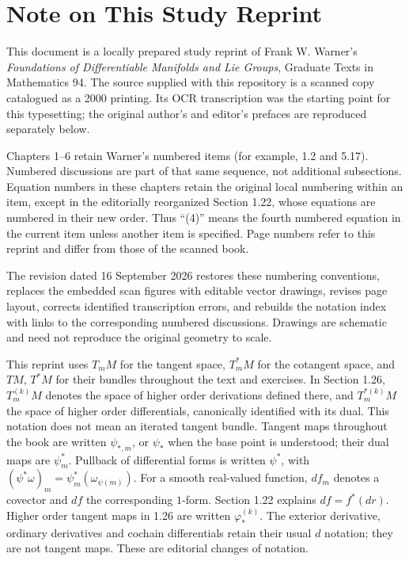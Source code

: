 \chapter*{Note on This Study Reprint}
This document is a locally prepared study reprint of Frank W. Warner's
\emph{Foundations of Differentiable Manifolds and Lie Groups}, Graduate Texts
in Mathematics 94. The source supplied with this repository is a scanned
copy catalogued as a 2000 printing. Its OCR transcription was the starting
point for this typesetting; the original author's and editor's prefaces
are reproduced separately below.

Chapters 1--6 retain Warner's numbered items (for example, 1.2 and 5.17).
Numbered discussions are part of that same sequence, not additional
subsections. Equation numbers in these chapters retain the original local
numbering within an item, except in the editorially reorganized Section 1.22,
whose equations are numbered in their new order. Thus ``(4)'' means the fourth numbered equation
in the current item unless another item is specified. Page numbers refer
to this reprint and differ from those of the scanned book.

The revision dated 16 September 2026 restores these numbering conventions,
replaces the embedded scan figures with editable vector drawings, revises
page layout, corrects identified transcription errors, and rebuilds the
notation index with links to the corresponding numbered discussions.
Drawings are schematic and need not reproduce the original geometry to scale.

This reprint uses $T_mM$ for the tangent space, $T_m^*M$ for the
cotangent space, and $TM$, $T^*M$ for their bundles throughout the text
and exercises. In Section 1.26, $T_m^{(k)}M$ denotes the space of
higher order derivations defined there, and $T_m^{*(k)}M$ the space of
higher order differentials, canonically identified with its dual.
This notation does not mean an iterated tangent bundle.
Tangent maps throughout the book are written $\psi_{*,m}$, or $\psi_*$
when the base point is understood; their dual maps are $\psi_m^*$.
Pullback of differential forms is written $\psi^*$, with
$(\psi^*\omega)_m=\psi_m^*(\omega_{\psi(m)})$.
For a smooth real-valued function, $df_m$ denotes a covector and $df$
the corresponding $1$-form. Section 1.22 explains $df=f^*(dr)$.
Higher order tangent maps in 1.26 are written $\varphi_*^{(k)}$.
The exterior derivative, ordinary derivatives and cochain differentials
retain their usual $d$ notation; they are not tangent maps.
These are editorial changes of notation.

